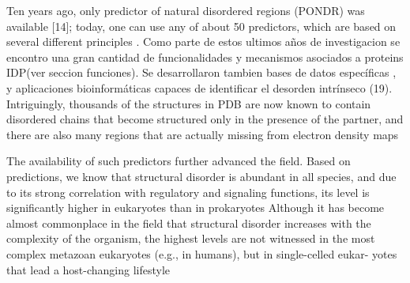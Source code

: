 

Ten years ago, only predictor of natural disordered regions (PONDR) was available [14]; today, one can use any of about 50 predictors, which are based on several different principles \cite{he2009predicting}.
Como parte de estos ultimos años de investigacion se encontro una gran cantidad de funcionalidades y mecanismos asociados a proteins IDP(ver seccion funciones).
Se desarrollaron tambien bases de datos específicas \cite{sickmeier2007disprot,fukuchi2012ideal}, y aplicaciones bioinformáticas capaces de identificar el desorden intrínseco (19).
Intriguingly, thousands of the structures in PDB are now known to contain disordered chains that become structured only in the presence of the partner, and there are also many regions that are actually missing from electron density maps

The availability of such predictors further advanced the field.
Based on predictions, we know that structural disorder is abundant in all species, and due to its strong correlation with regulatory and signaling functions, its level is significantly higher in eukaryotes than in prokaryotes
Although it has become almost commonplace in the field that structural disorder increases with the complexity of the organism, the highest levels are not witnessed in the most complex metazoan eukaryotes (e.g., in humans), but in single-celled eukar-
yotes that lead a host-changing lifestyle

